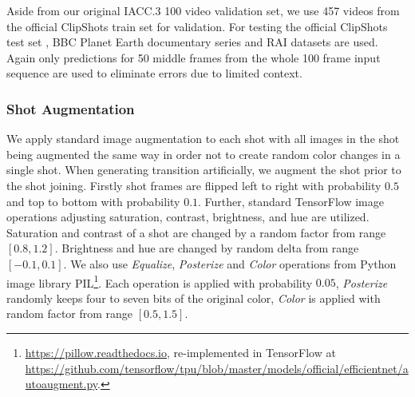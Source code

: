 Aside from our original IACC.3 100 video validation set, we use 457 videos from the official ClipShots train set for validation. For testing the official ClipShots test set \cite{Tang2018}, BBC Planet Earth documentary series \cite{BaraldiScenes} and RAI \cite{Baraldi15} datasets are used. Again only predictions for 50 middle frames from the whole 100 frame input sequence are used to eliminate errors due to limited context.

\subsubsection{Shot Augmentation}
We apply standard image augmentation to each shot with all images in the shot being augmented the same way in order not to create random color changes in a single shot. When generating transition artificially, we augment the shot prior to the shot joining. Firstly shot frames are flipped left to right with probability $0.5$ and top to bottom with probability $0.1$. Further, standard TensorFlow image operations adjusting saturation, contrast, brightness, and hue are utilized. Saturation and contrast of a shot are changed by a random factor from range $\left[0.8,1.2\right]$. Brightness and hue are changed by random delta from range $\left[-0.1,0.1\right]$. We also use \textit{Equalize}, \textit{Posterize} and \textit{Color} operations from Python image library PIL\footnote{\url{https://pillow.readthedocs.io}, re-implemented in TensorFlow at \url{https://github.com/tensorflow/tpu/blob/master/models/official/efficientnet/autoaugment.py}.}. Each operation is applied with probability $0.05$, \textit{Posterize} randomly keeps four to seven bits of the original color, \textit{Color} is applied with random factor from range $\left[0.5,1.5\right]$.

